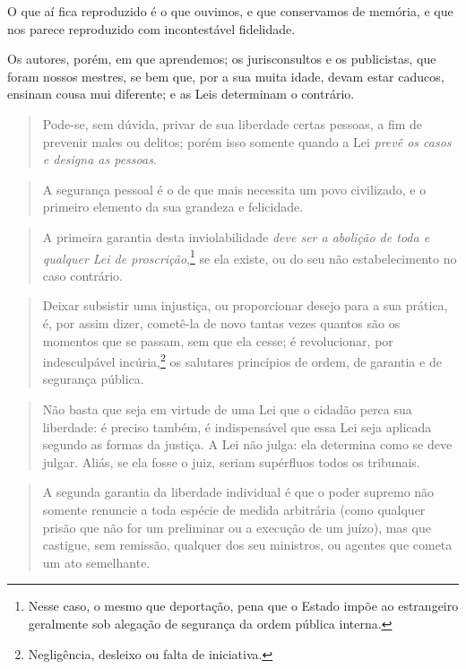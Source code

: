 {O que aí fica reproduzido é o que ouvimos, e que conservamos de memória,
e que nos parece reproduzido com incontestável fidelidade.

Os autores, porém, em que aprendemos; os jurisconsultos e os
publicistas, que foram nossos mestres, se bem que, por a sua muita
idade, devam estar caducos, ensinam cousa mui diferente; e as Leis
determinam o contrário.

\begin{quote}
Pode-se, sem dúvida, privar de sua liberdade certas pessoas, a fim de
prevenir males ou delitos; porém isso somente quando a Lei \emph{prevê
os casos e designa as pessoas}.
\end{quote}

\begin{quote}
A segurança pessoal é o de que mais necessita um povo civilizado, e o
primeiro elemento da sua grandeza e felicidade.
\end{quote}

\begin{quote}
A primeira garantia desta inviolabilidade \emph{deve ser a abolição
de toda e qualquer Lei de proscrição},\footnote{Nesse caso, o mesmo
que deportação, pena que o Estado impõe ao estrangeiro geralmente
sob alegação de segurança da ordem pública interna.} se ela existe,
ou do seu não estabelecimento no caso contrário.
  \end{quote}

\begin{quote}
Deixar subsistir uma injustiça, ou proporcionar desejo para a sua
prática, é, por assim dizer, cometê-la de novo tantas vezes quantos
são os momentos que se passam, sem que ela cesse; é revolucionar, por
indesculpável incúria,\footnote{Negligência, desleixo ou falta de
iniciativa.} os salutares princípios de ordem, de garantia e de
segurança pública.
\end{quote}

\begin{quote}
Não basta que seja em virtude de uma Lei que o cidadão perca sua
liberdade: é preciso também, é indispensável que essa Lei seja
aplicada segundo as formas da justiça. A Lei não julga: ela determina
como se deve julgar. Aliás, se ela fosse o juiz, seriam supérfluos
todos os tribunais.
\end{quote}

\begin{quote}
A segunda garantia da liberdade individual é que o poder supremo não
somente renuncie a toda espécie de medida arbitrária (como qualquer
prisão que não for um preliminar ou a execução de um juízo), mas que
castigue, sem remissão, qualquer dos seu ministros, ou agentes que
cometa um ato semelhante.
\end{quote}

}
